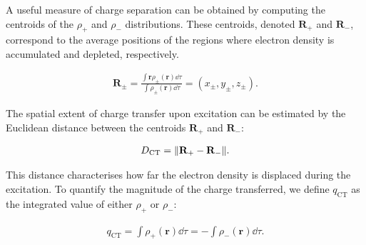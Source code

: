 \vspace{1em}%
\vspace{1em}%

A useful measure of charge separation can be obtained by computing the
centroids of the $\rho_+$ and $\rho_-$ distributions. These centroids,
denoted $\mathbf{R}_+$ and $\mathbf{R}_-$, correspond to the average positions
of the regions where electron density is accumulated and depleted,
respectively.

\begin{align}
  \mathbf{R}_\pm = \frac
    {\int \mathbf{r}\rho_{\pm}(\mathbf{r})\dd\tau}
      {\int\rho_{\pm}(\mathbf{r})\dd\tau} =
    (x_{\pm}, y_{\pm}, z_{\pm}).
  \label{centroid}
\end{align}

\newpage
The spatial extent of charge transfer upon excitation can be estimated by the
Euclidean distance between the centroids $\mathbf{R}_+$ and $\mathbf{R}_-$:

\begin{align}
  D_\mathrm{CT} = \norm{\mathbf{R}_+ - \mathbf{R}_-}.
  \label{ct_exci}
\end{align}

This distance characterises how far the electron density is displaced during
the excitation. To quantify the magnitude of the charge transferred, we define
$q_{\mathrm{CT}}$ as the integrated value of either $\rho_+$ or $\rho_-$:

\begin{align}
  q_{\mathrm{CT}} = \int\rho_+(\mathbf{r})\dd\tau = -\int\rho_-(\mathbf{r})\dd\tau.
\end{align}

